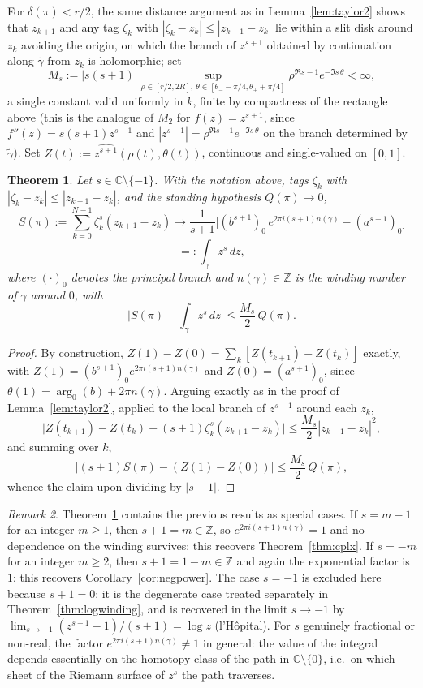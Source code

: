 \documentclass[11pt,fleqn]{article}
\def\C{\mathbb C}
\def\Z{\mathbb Z}
\theoremstyle{plain}
\newtheorem{thm}{Theorem}[section]
\theoremstyle{remark}
\newtheorem{remark}[thm]{Remark}
\begin{document}
For $\delta(\pi)<r/2$, the same distance argument as in
Lemma~\ref{lem:taylor2} shows that $z_{k+1}$ and any tag $\zeta_k$ with
$|\zeta_k-z_k|\le|z_{k+1}-z_k|$ lie within a slit disk around $z_k$
avoiding the origin, on which the branch of $z^{s+1}$ obtained by
continuation along $\widetilde\gamma$ from $z_k$ is holomorphic; set
\[
M_s:=|s(s+1)|\sup_{\rho\in[r/2,2R],\ \theta\in[\theta_--\pi/4,\theta_++\pi/4]}
\rho^{\Re s-1}e^{-\Im s\,\theta}<\infty,
\]
a single constant valid uniformly in $k$, finite by compactness of the
rectangle above (this is the analogue of $M_2$ for $f(z)=z^{s+1}$, since
$f''(z)=s(s+1)z^{s-1}$ and $|z^{s-1}|=\rho^{\Re s-1}e^{-\Im s\,\theta}$ on
the branch determined by $\widetilde\gamma$). Set
$Z(t):=\widehat{z^{s+1}}(\rho(t),\theta(t))$, continuous and single-valued
on $[0,1]$.

\begin{thm}\label{thm:fracpower}
Let $s\in\C\setminus\{-1\}$. With the notation above, tags $\zeta_k$ with
$|\zeta_k-z_k|\le|z_{k+1}-z_k|$, and the standing hypothesis $Q(\pi)\to0$,
\[
S(\pi):=\sum_{k=0}^{N-1}\zeta_k^s(z_{k+1}-z_k)\longrightarrow
\frac1{s+1}\Big[(b^{s+1})_0\,e^{2\pi i(s+1)n(\gamma)}-(a^{s+1})_0\Big]
\]
\[
=:\int_\gamma z^s\,dz,
\]
where $(\cdot)_0$ denotes the principal branch and $n(\gamma)\in\Z$ is the
winding number of $\gamma$ around $0$, with
\[
\Big|S(\pi)-\int_\gamma z^s\,dz\Big|\le\frac{M_s}2\,Q(\pi).
\]
\end{thm}
\begin{proof}
By construction, $Z(1)-Z(0)=\sum_k[Z(t_{k+1})-Z(t_k)]$ exactly, with
$Z(1)=(b^{s+1})_0e^{2\pi i(s+1)n(\gamma)}$ and $Z(0)=(a^{s+1})_0$, since
$\theta(1)=\arg_0(b)+2\pi n(\gamma)$. Arguing exactly as in the proof of
Lemma~\ref{lem:taylor2}, applied to the local branch of $z^{s+1}$ around
each $z_k$,
\[
\big|Z(t_{k+1})-Z(t_k)-(s+1)\zeta_k^s(z_{k+1}-z_k)\big|
\le\frac{M_s}2|z_{k+1}-z_k|^2,
\]
and summing over $k$,
\[
\big|(s+1)S(\pi)-(Z(1)-Z(0))\big|\le\frac{M_s}2\,Q(\pi),
\]
whence the claim upon dividing by $|s+1|$. \qedhere
\end{proof}

\begin{remark}
Theorem~\ref{thm:fracpower} contains the previous results as special
cases. If $s=m-1$ for an integer $m\ge1$, then $s+1=m\in\Z$, so
$e^{2\pi i(s+1)n(\gamma)}=1$ and no dependence on the winding survives:
this recovers Theorem~\ref{thm:cplx}. If $s=-m$ for an integer $m\ge2$,
then $s+1=1-m\in\Z$ and again the exponential factor is $1$: this
recovers Corollary~\ref{cor:negpower}. The case $s=-1$ is excluded here
because $s+1=0$; it is the degenerate case treated separately in
Theorem~\ref{thm:logwinding}, and is recovered in the limit $s\to-1$ by
$\lim_{s\to-1}(z^{s+1}-1)/(s+1)=\log z$ (l'H\^opital). For $s$ genuinely
fractional or non-real, the factor $e^{2\pi i(s+1)n(\gamma)}\ne1$ in
general: the value of the integral depends essentially on the homotopy
class of the path in $\C\setminus\{0\}$, i.e.\ on which sheet of the
Riemann surface of $z^s$ the path traverses.
\end{remark}
\end{document}
